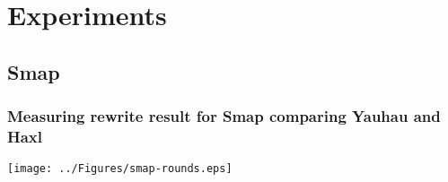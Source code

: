 
\chapter{Experiments} %

\label{ChapterExperiments} %


\section{Smap}

\subsection{Measuring rewrite result for Smap comparing Yauhau and Haxl}

\texttt{[image: ../Figures/smap-rounds.eps]}
